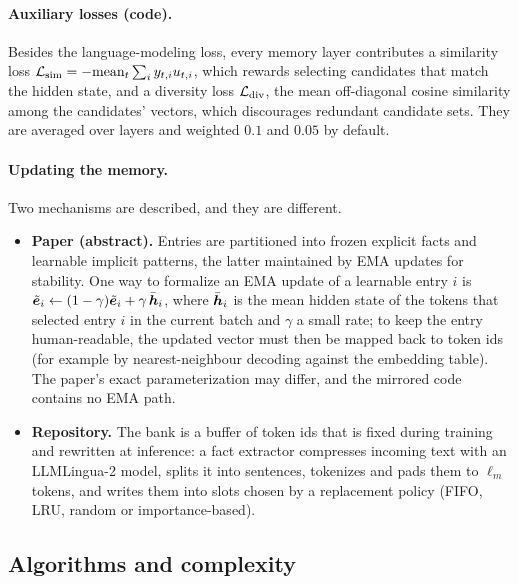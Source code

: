 \paragraph{Auxiliary losses (code).} Besides the language-modeling loss, every memory layer
contributes a similarity loss $\mathcal{L}_{\mathrm{sim}} = -\mathrm{mean}_t \sum_i y_{t,i} u_{t,i}$,
which rewards selecting candidates that match the hidden state, and a diversity loss
$\mathcal{L}_{\mathrm{div}}$, the mean off-diagonal cosine similarity among the candidates' vectors,
which discourages redundant candidate sets. They are averaged over layers and weighted
$0.1$ and $0.05$ by default.

\paragraph{Updating the memory.} Two mechanisms are described, and they are different.
\begin{itemize}
  \item \textbf{Paper (abstract).} Entries are partitioned into frozen explicit facts and learnable
        implicit patterns, the latter maintained by EMA updates for stability. One way to formalize
        an EMA update of a learnable entry $i$ is
        $\tilde{\bm{e}}_i \gets (1-\gamma)\tilde{\bm{e}}_i + \gamma\, \bar{\bm{h}}_i$, where $\bar{\bm{h}}_i$ is the
        mean hidden state of the tokens that selected entry $i$ in the current batch and $\gamma$ a
        small rate; to keep the entry human-readable, the updated vector must then be mapped back to
        token ids (for example by nearest-neighbour decoding against the embedding table). The
        paper's exact parameterization may differ, and the mirrored code contains no EMA path.
  \item \textbf{Repository.} The bank is a buffer of token ids that is fixed during training and
        rewritten at inference: a fact extractor compresses incoming text with an LLMLingua-2
        model, splits it into sentences, tokenizes and pads them to $\ell_m$ tokens, and writes them
        into slots chosen by a replacement policy (FIFO, LRU, random or importance-based).
\end{itemize}

\subsection{Algorithms and complexity}

